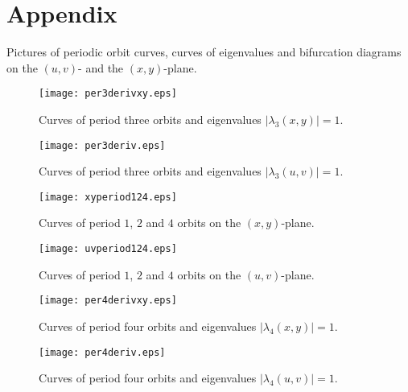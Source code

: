 \documentclass[12pt,a4paper]{amsart}
\numberwithin{equation}{section}
\numberwithin{lause}{section}
\begin{document}
\clearpage
\section{Appendix}
Pictures of periodic orbit curves, curves of eigenvalues and bifurcation diagrams on the $(u,v)$- and the $(x,y)$-plane.

\begin{figure}[h!]
\begin{center}
\texttt{[image: per3derivxy.eps]}
\caption{Curves of period three orbits and eigenvalues $|\lambda_{3}(x,y)|=1$.} \label{kuva8}
\end{center}
\end{figure}
\begin{figure}[h!]
\begin{center}
\texttt{[image: per3deriv.eps]}
\caption{Curves of period three orbits and eigenvalues $|\lambda_{3}(u,v)|=1$.} \label{kuva8.1}
\end{center}
\end{figure}
\clearpage



\clearpage

\begin{figure}[h!]
\begin{center}
\texttt{[image: xyperiod124.eps]}
\caption{Curves of period $1$, $2$ and $4$ orbits on the $(x,y)$-plane.}
\label{kuva9}
\end{center}
\end{figure}
\begin{figure}[h!]
\begin{center}
\texttt{[image: uvperiod124.eps]}
\caption{Curves of period $1$, $2$ and $4$ orbits on the $(u,v)$-plane.}
\label{kuva9.1}
\end{center}
\end{figure}
\clearpage


\clearpage

\begin{figure}[h!]
\begin{center}
\texttt{[image: per4derivxy.eps]}
\caption{Curves of period four orbits and eigenvalues $|\lambda_{4}(x,y)|=1$.}
\label{kuva9.3}
\end{center}
\end{figure}

\begin{figure}[h!]
\begin{center}
\texttt{[image: per4deriv.eps]}
\caption{Curves of period four orbits and eigenvalues $|\lambda_{4}(u,v)|=1$.}
\label{kuva9.4}
\end{center}
\end{figure}
\end{document}

